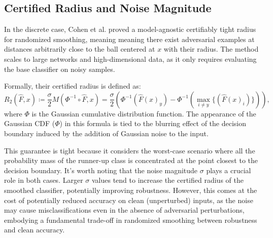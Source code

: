 \subsection{Certified Radius and Noise Magnitude}\label{subsec:certified-radius-and-noise-magnitude}
In the discrete case, Cohen et al.
proved a model-agnostic certifiably tight radius for randomized smoothing, meaning meaning there exist adversarial examples at distances arbitrarily close to the ball centered at $x$ with their radius.
The method scales to large networks and high-dimensional data, as it only requires evaluating the base classifier on noisy samples.

Formally, their certified radius is defined as:
\begin{equation}
    R_2(\hat{F},x) \coloneqq \frac{\sigma}{2}M(\Phi^{-1}\circ\hat{F},x)=\frac{\sigma}{2}\left(\Phi^{-1}(\hat{F}(x)_{y})-\Phi^{-1}(\max_{i \neq y}\{ (\hat{F}(x)_i) \})\right),\label{eq:second-radius}
\end{equation}
where $\Phi$ is the Gaussian cumulative distribution function.
The appearance of the Gaussian CDF ($\Phi$) in this formula is tied to the blurring effect of the decision boundary induced by the addition of Gaussian noise to the input.

This guarantee is tight because it considers the worst-case scenario where all the probability mass of the runner-up class is concentrated at the point closest to the decision boundary.
It's worth noting that the noise magnitude $\sigma$ plays a crucial role in both cases.
Larger $\sigma$ values tend to increase the certified radius of the smoothed classifier, potentially improving robustness.
However, this comes at the cost of potentially reduced accuracy on clean (unperturbed) inputs, as the noise may cause misclassifications even in the absence of adversarial perturbations, embodying a fundamental trade-off in randomized smoothing between robustness and clean accuracy.